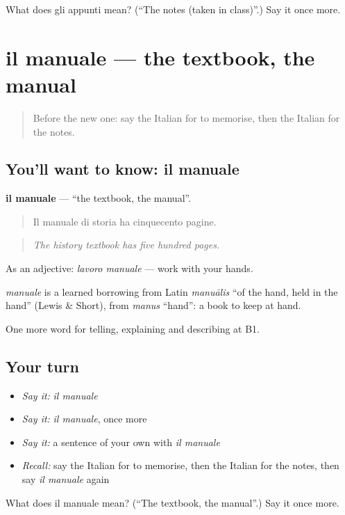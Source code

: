 \begin{tcolorbox}[breakable,colback=teal!4,colframe=teal!35!black,title={Before you move on}]
What does gli appunti mean? (\textquotedblleft{}The notes (taken in class)\textquotedblright{}.) Say it once more.
\end{tcolorbox}
\section[il manuale]{il manuale — the textbook, the manual}

\label{lesson:IT-C382-manuale}



\begin{quote}
Before the new one: say the Italian for to memorise, then the Italian for the notes.
\end{quote}

\subsection*{You'll want to know: il manuale}
\textbf{il manuale} — \textquotedblleft{}the textbook, the manual\textquotedblright{}.

\begin{quote}
Il manuale di storia ha cinquecento pagine.
\end{quote}

\begin{quote}
\emph{The history textbook has five hundred pages.}
\end{quote}

As an adjective: \emph{lavoro manuale} — work with your hands.

\begin{cousinweb}
\emph{manuale} is a learned borrowing from Latin \emph{manuālis} \textquotedblleft{}of the hand, held in the hand\textquotedblright{} (Lewis \& Short), from \emph{manus} \textquotedblleft{}hand\textquotedblright{}: a book to keep at hand.
\end{cousinweb}

\begin{grammarlens}[title={What you've built}]
One more word for telling, explaining and describing at B1.
\end{grammarlens}

\subsection*{Your turn}
\begin{itemize}
\raggedright
  \item \emph{Say it:} \emph{il manuale}
  \item \emph{Say it:} \emph{il manuale}, once more
  \item \emph{Say it:} a sentence of your own with \emph{il manuale}
  \item \emph{Recall:} say the Italian for to memorise, then the Italian for the notes, then say \emph{il manuale} again
\end{itemize}

\begin{tcolorbox}[breakable,colback=teal!4,colframe=teal!35!black,title={Before you move on}]
What does il manuale mean? (\textquotedblleft{}The textbook, the manual\textquotedblright{}.) Say it once more.
\end{tcolorbox}
